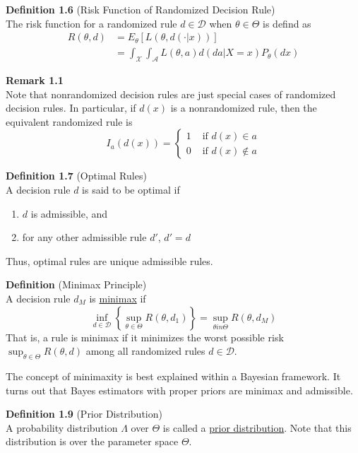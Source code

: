 \documentclass[12pt]{article}
\numberwithin{equation}{section}
\begin{document}
\textbf{Definition 1.6} (Risk Function of Randomized Decision Rule) \\
The risk function for a randomized rule $d \in \mathcal{D}$ when $\theta \in \Theta$ is defind as
\begin{align*}
  R(\theta, d) &= E_{\theta}[L(\theta, d(\cdot | x))] \\
    &= \int_{\mathcal{X}} \int_{\mathcal{A}} L(\theta, a) d(da | X = x) P_{\theta}(dx)
\end{align*}

\textbf{Remark 1.1} \\
Note that nonrandomized decision rules are just special cases of randomized decision rules. In particular, if $d(x)$ is a nonrandomized rule, then the equivalent randomized rule is
\begin{equation*}
  I_{a}(d(x)) = \begin{cases}
  1 & \text{ if } d(x) \in a \\
  0 & \text{ if } d(x) \notin a
  \end{cases}
\end{equation*}

\textbf{Definition 1.7} (Optimal Rules) \\
A decision rule $d$ is said to be optimal if
\begin{enumerate}
  \item $d$ is admissible, and
  \item for any other admissible rule $d'$, $d' = d$
\end{enumerate}
Thus, optimal rules are unique admissible rules.

\textbf{Definition} (Minimax Principle) \\
A decision rule $d_{M}$ is \underline{minimax} if
\begin{equation*}
  \inf_{d \in \mathcal{D}} \left\{\sup_{\theta \in \Theta} R(\theta, d_1) \right\} 
  = \sup_{\theta in \Theta} R(\theta, d_{M})
\end{equation*}
That is, a rule is minimax if it minimizes the worst possible risk 
$\sup_{\theta \in \Theta} R(\theta, d)$ among all randomized rules $d \in \mathcal{D}$. 

The concept of minimaxity is best explained within a Bayesian framework. It turns out that Bayes estimators with proper priors are minimax and admissible.

\textbf{Definition 1.9} (Prior Distribution) \\
A probability distribution $\Lambda$ over $\Theta$ is called a \underline{prior distribution}. Note that this distribution is over the parameter space $\Theta$. 
\end{document}
